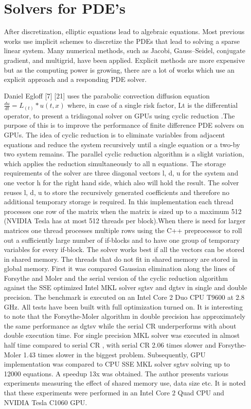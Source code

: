 \section{Solvers for PDE's}
After discretization, elliptic equations lead to algebraic equations. Most previous works use implicit schemes to discretize the PDEs that lead to solving a sparse linear system. Many numerical methods, such as Jacobi, Gauss–Seidel, conjugate gradient, and multigrid, have been applied. Explicit methods are more expensive but as the computing power is growing, there are a lot of works which use an explicit approach and a responding PDE solver.

Daniel Egloff  [7] [21] uses the parabolic convection diffusion equation $\frac{du}{dt} = L_(t )*u(t,x)$   where, in case of a single risk factor, Lt is the differential operator, to present a tridiagonal solver on GPUs using cyclic reduction .The purpose of this is to improve  the performance of  finite difference PDE solvers on GPUs. The idea of cyclic reduction is to eliminate variables from adjacent equations and reduce the system recursively until a single equation or a two-by two system remains. The parallel cyclic reduction algorithm is a slight variation, which applies the reduction simultaneously to all n equations. The storage requirements of the solver are three diagonal vectors l, d, u for the system and one vector h for the right hand side, which also will hold the result. The solver reuses l, d, u to store the recursively generated coefficients and therefore no additional temporary storage is required. In this implementation each thread processes one row of the matrix when the matrix is sized up to a maximum 512 (NVIDIA Tesla has at most 512 threads per block).When there is need for larger matrices one thread processes multiple rows using the C++ preprocessor to roll out a sufficiently large number of if-blocks and to have one group of temporary variables for every if-block. The solver works best if all the vectors can be stored in shared memory. The threads that do not fit in shared memory are stored in global memory.  First it was compared Gaussian elimination along the lines of Forsythe and Moler and the serial version of the cyclic reduction algorithm against the SSE optimized Intel MKL solver sgtsv and dgtsv in single and double precision. The benchmark is executed on an Intel Core 2 Duo CPU T9600 at 2.8 GHz. All tests have been built with full optimization turned on. It is interesting to note that the Forsythe-Moler algorithm in double precision has approximately the same performance as dgtsv while the serial CR underperforms with about double execution time. For single precision MKL solver was executed in almost half time compared to serial CR , with serial CR 2.06 times slower and Forsythe-Moler 1.43 times slower in the biggest problem. Subsequently, GPU implementation was compared to CPU SSE MKL solver sgtsv solving up to 12000 equations. A speedup 13x was obtained. The author presents various experiments measuring the effect of shared memory use, data size etc. It is noted that these experiments were performed in an Intel Core 2 Quad CPU and NVIDIA Tesla C1060 GPU.

